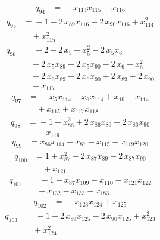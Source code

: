 \documentclass[11pt]{article}
\theoremstyle{remark}\newtheorem{remark}[theorem]{Remark}
\begin{document}
\begin{align*}
q_{94} &={}-x_{114}x_{115} +x_{116}
\end{align*}
\begin{align*}
q_{95} &={}-1 -2\,x_{89}x_{116} -2\,x_{90}x_{116} +x_{114}^{2}\\
&\quad +x_{115}^{2}
\end{align*}
\begin{align*}
q_{96} &={}-2 -2\,x_{5} -x_{5}^{2} -2\,x_{5}x_{6}\\
&\quad +2\,x_{5}x_{89} +2\,x_{5}x_{90} -2\,x_{6} -x_{6}^{2}\\
&\quad +2\,x_{6}x_{89} +2\,x_{6}x_{90} +2\,x_{89} +2\,x_{90}\\
&\quad -x_{117}
\end{align*}
\begin{align*}
q_{97} &={}-x_{5}x_{114} -x_{6}x_{114} +x_{19} -x_{114}\\
&\quad +x_{115} +x_{117}x_{118}
\end{align*}
\begin{align*}
q_{98} &={}-1 -x_{86}^{2} +2\,x_{86}x_{89} +2\,x_{86}x_{90}\\
&\quad -x_{119}
\end{align*}
\begin{align*}
q_{99} &={}x_{86}x_{114} -x_{87} -x_{115} -x_{119}x_{120}
\end{align*}
\begin{align*}
q_{100} &={}1 +x_{87}^{2} -2\,x_{87}x_{89} -2\,x_{87}x_{90}\\
&\quad +x_{121}
\end{align*}
\begin{align*}
q_{101} &={}-1 +x_{87}x_{109} -x_{110} -x_{121}x_{122}\\
&\quad -x_{132} -x_{133} -x_{183}
\end{align*}
\begin{align*}
q_{102} &={}-x_{123}x_{124} +x_{125}
\end{align*}
\begin{align*}
q_{103} &={}-1 -2\,x_{89}x_{125} -2\,x_{90}x_{125} +x_{123}^{2}\\
&\quad +x_{124}^{2}
\end{align*}
\end{document}
